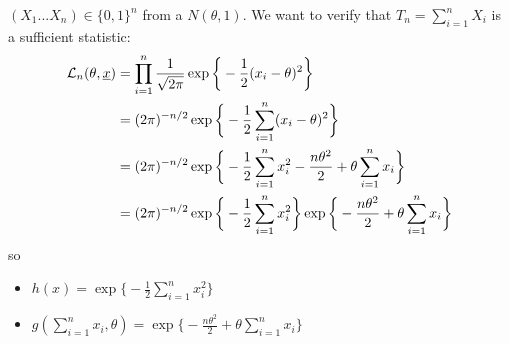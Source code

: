 \begin{eg}\label{eg:gauss}
		$(X_1... X_n)\in \{0,1\}^n$ from a $N(\theta,1)$. We want to verify that $T_n=\sum_{i=1}^{n} X_i$ is a sufficient statistic:
		\[
		\begin{split}
			\mathcal{L}_n(\theta,\underline x)
			&=\prod_{i=1}^{n}\frac{1}{\sqrt{2 \pi}} \exp \bigg\{ -\frac{1}{2} (x_i-\theta)^2 \bigg\}\\
			&=(2\pi)^{-n/2}\exp \bigg\{ -\frac{1}{2} \sum_{i=1}^{n}(x_i-\theta)^2 \bigg\}\\
			&=(2\pi)^{-n/2}\exp \bigg\{ -\frac{1}{2} \sum_{i=1}^{n}x_i^2- \frac{n\theta^2}{2}+\theta\sum_{i=1}^{n} x_i \bigg\}\\
			&=(2\pi)^{-n/2}\exp \bigg\{ -\frac{1}{2} \sum_{i=1}^{n}x_i^2 \bigg\} \exp \bigg\{- \frac{n\theta^2}{2}+\theta\sum_{i=1}^{n} x_i \bigg\}
		\end{split}
		\]
		so
		\begin{itemize}
			\item $h(x)=\exp \bigg\{ -\frac{1}{2} \sum_{i=1}^{n}x_i^2 \bigg\}$
			\item $g(\sum_{i=1}^n x_i,\theta) = \exp \bigg\{- \frac{n\theta^2}{2}+\theta\sum_{i=1}^{n} x_i \bigg\}$
		\end{itemize}
\end{eg}

